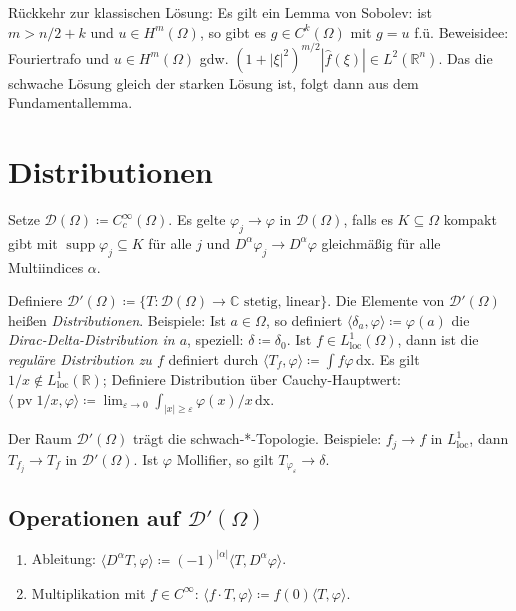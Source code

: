 \documentclass[11pt,a4paper]{scrartcl}
\newcommand{\R}{\mathbb{R}} %
\newcommand{\C}{\mathbb{C}} %
\newcommand{\D}{\mathcal{D}}
\theoremstyle{plain}
\theoremstyle{definition}
\theoremstyle{remark}
\DeclareMathOperator{\supp}{supp}
\DeclareMathOperator{\loc}{loc}
\DeclareMathOperator{\pv}{pv}
\begin{document}
Rückkehr zur klassischen Lösung: Es gilt ein Lemma von Sobolev: ist $m > n/2 + k$ und $u\in H^m(\Omega)$, so gibt es $g\in C^k(\Omega)$ mit $g=u$ f.ü. Beweisidee: Fouriertrafo und $u\in H^m(\Omega)$ gdw. $(1+|\xi|^2)^{m/2} |\hat f(\xi)| \in L^2(\R^n)$. Das die schwache Lösung gleich der starken Lösung ist, folgt dann aus dem Fundamentallemma.

\section{Distributionen}

Setze $\D(\Omega)\coloneqq C_c^\infty(\Omega)$. Es gelte $\varphi_j \to \varphi$ in $\D(\Omega)$, falls es $K\subseteq \Omega$ kompakt gibt mit $\supp \varphi_j \subseteq K$ für alle $j$ und $D^\alpha \varphi_j \to D^\alpha \varphi$ gleichmäßig für alle Multiindices $\alpha$.

Definiere $\D'(\Omega)\coloneqq \{ T: \D(\Omega) \to \C \text{ stetig, linear} \}$. Die Elemente von $\D'(\Omega)$ heißen \emph{Distributionen}. Beispiele: Ist $a\in \Omega$, so definiert $\langle \delta_a, \varphi \rangle \coloneqq \varphi(a)$ die \emph{Dirac-Delta-Distribution in $a$}, speziell: $\delta \coloneqq \delta_0$. Ist $f\in L^1_{\loc}(\Omega)$, dann ist die \emph{reguläre Distribution zu $f$} definiert durch $\langle T_f, \varphi \rangle \coloneqq \int f\varphi \, \mathrm{dx}$. Es gilt $1/x\not\in L^1_{\loc}(\R)$; Definiere Distribution über Cauchy-Hauptwert: $\langle \pv 1/x, \varphi \rangle \coloneqq \lim_{\varepsilon \to 0} \int_{|x|\geq \varepsilon} \varphi(x)/x \, \mathrm{dx}$.

Der Raum $\D'(\Omega)$ trägt die schwach-*-Topologie. Beispiele: $f_j\to f$ in $L^1_{\loc}$, dann $T_{f_j}\to T_f$ in $\D'(\Omega)$. Ist $\varphi$ Mollifier, so gilt $T_{\varphi_\varepsilon}\to \delta$.

\subsection{Operationen auf $\D'(\Omega)$}

\begin{enumerate}
    \item Ableitung: $\langle D^\alpha T, \varphi \rangle \coloneqq (-1)^{|\alpha|} \langle T, D^\alpha \varphi \rangle$.
    \item Multiplikation mit $f\in C^\infty$: $\langle f\cdot T, \varphi \rangle \coloneqq f(0) \langle T, \varphi \rangle$.
\end{enumerate}
\end{document}
